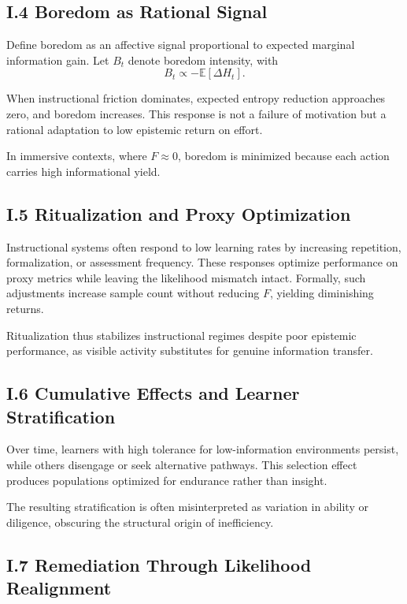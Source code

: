 \documentclass[11pt]{article}
\begin{document}
\subsection{I.4 Boredom as Rational Signal}

Define boredom as an affective signal proportional to expected marginal information gain. Let \(B_t\) denote boredom intensity, with
\[
B_t \propto -\mathbb{E}[\Delta H_t].
\]

When instructional friction dominates, expected entropy reduction approaches zero, and boredom increases. This response is not a failure of motivation but a rational adaptation to low epistemic return on effort.

In immersive contexts, where \(F \approx 0\), boredom is minimized because each action carries high informational yield.

\subsection{I.5 Ritualization and Proxy Optimization}

Instructional systems often respond to low learning rates by increasing repetition, formalization, or assessment frequency. These responses optimize performance on proxy metrics while leaving the likelihood mismatch intact. Formally, such adjustments increase sample count without reducing \(F\), yielding diminishing returns.

Ritualization thus stabilizes instructional regimes despite poor epistemic performance, as visible activity substitutes for genuine information transfer.

\subsection{I.6 Cumulative Effects and Learner Stratification}

Over time, learners with high tolerance for low-information environments persist, while others disengage or seek alternative pathways. This selection effect produces populations optimized for endurance rather than insight.

The resulting stratification is often misinterpreted as variation in ability or diligence, obscuring the structural origin of inefficiency.

\subsection{I.7 Remediation Through Likelihood Realignment}
\end{document}
